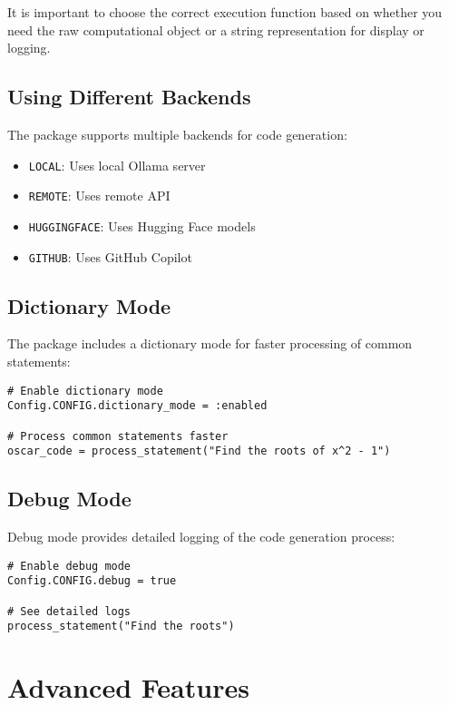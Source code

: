 \documentclass[11pt,a4paper]{article}
\begin{document}
It is important to choose the correct execution function based on whether you need the raw computational object or a string representation for display or logging.


\subsection{Using Different Backends}

The package supports multiple backends for code generation:

\begin{itemize}
    \item \texttt{LOCAL}: Uses local Ollama server
    \item \texttt{REMOTE}: Uses remote API
    \item \texttt{HUGGINGFACE}: Uses Hugging Face models
    \item \texttt{GITHUB}: Uses GitHub Copilot
\end{itemize}

\subsection{Dictionary Mode}

The package includes a dictionary mode for faster processing of common statements:

\begin{lstlisting}
# Enable dictionary mode
Config.CONFIG.dictionary_mode = :enabled

# Process common statements faster
oscar_code = process_statement("Find the roots of x^2 - 1")
\end{lstlisting}

\subsection{Debug Mode}

Debug mode provides detailed logging of the code generation process:

\begin{lstlisting}
# Enable debug mode
Config.CONFIG.debug = true

# See detailed logs
process_statement("Find the roots")
\end{lstlisting}

\section{Advanced Features}
\end{document}
